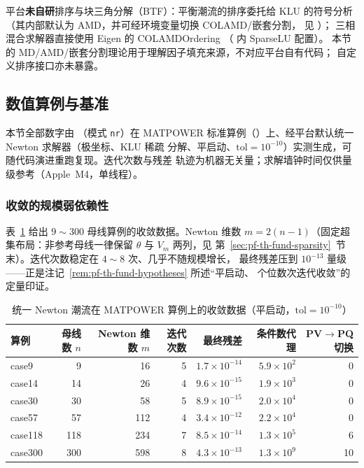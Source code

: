 \begin{gapnote}
平台\textbf{未自研}排序与块三角分解（BTF）：平衡潮流的排序委托给
KLU 的符号分析（其内部默认为 AMD，并可经环境变量切换 COLAMD/嵌套分割，
见 ）；
三相混合求解器直接使用 Eigen 的 COLAMDOrdering
（ 内 SparseLU 配置）。
本节的 MD/AMD/嵌套分割理论用于理解因子填充来源，不对应平台自有代码；
自定义排序接口亦未暴露。
\end{gapnote}

\subsection{数值算例与基准}\label{sec:pf-th-fund-numexp}

本节全部数字由 （模式 \texttt{nr}）在 MATPOWER
标准算例（）上、经平台默认统一 Newton 求解器（极坐标、KLU 稀疏
分解、平启动、$\mathrm{tol}=10^{-10}$）实测生成，可随代码演进重跑复现。迭代次数与残差
轨迹为机器无关量；求解墙钟时间仅供量级参考（Apple~M4，单线程）。

\subsubsection{收敛的规模弱依赖性}
表~\ref{tab:pf-th-fund-nrconv} 给出 $9\sim300$ 母线算例的收敛数据。Newton 维数
$m=2(n-1)$（固定超集布局：非参考母线一律保留 $\theta$ 与 $V_m$ 两列，见
第~\ref{sec:pf-th-fund-sparsity}~节末）。迭代次数稳定在 $4\sim8$ 次、几乎不随规模增长，
最终残差压到 $10^{-13}$ 量级——正是注记~\ref{rem:pf-th-fund-hypotheses} 所述“平启动、
个位数次迭代收敛”的定量印证。

\begin{table}[H]\centering\footnotesize
\caption{统一 Newton 潮流在 MATPOWER 算例上的收敛数据（平启动，$\mathrm{tol}=10^{-10}$）}
\label{tab:pf-th-fund-nrconv}
\begin{tabular}{@{}lrrrrrr@{}}
\toprule
算例 & 母线数 $n$ & Newton 维数 $m$ & 迭代次数 & 最终残差 & 条件数代理 & PV$\to$PQ 切换\\
\midrule
case9   & 9   & 16  & 5 & $1.7\times10^{-14}$ & $5.9\times10^{2}$ & 0\\
case14  & 14  & 26  & 4 & $9.6\times10^{-15}$ & $1.9\times10^{3}$ & 0\\
case30  & 30  & 58  & 5 & $8.9\times10^{-15}$ & $2.0\times10^{4}$ & 0\\
case57  & 57  & 112 & 4 & $3.4\times10^{-12}$ & $2.2\times10^{4}$ & 0\\
case118 & 118 & 234 & 7 & $8.5\times10^{-14}$ & $1.3\times10^{5}$ & 6\\
case300 & 300 & 598 & 8 & $4.3\times10^{-13}$ & $1.3\times10^{9}$ & 10\\
\bottomrule
\end{tabular}
\end{table}

